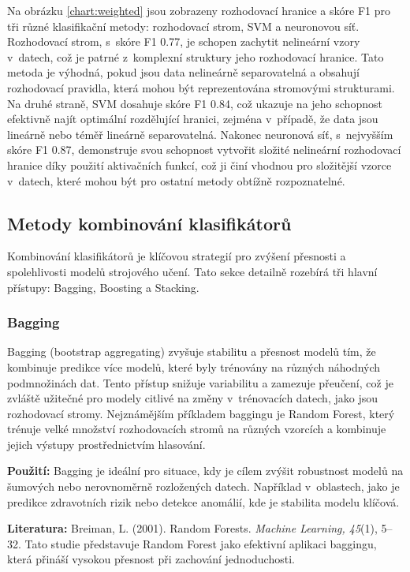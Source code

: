 Na obrázku \ref{chart:weighted} jsou zobrazeny rozhodovací hranice a skóre F1 pro tři různé klasifikační metody: rozhodovací strom, SVM a neuronovou síť. Rozhodovací strom, s~skóre F1 0.77, je schopen zachytit nelineární vzory v~datech, což je patrné z~komplexní struktury jeho rozhodovací hranice. Tato metoda je výhodná, pokud jsou data nelineárně separovatelná a obsahují rozhodovací pravidla, která mohou být reprezentována stromovými strukturami. Na druhé straně, SVM dosahuje skóre F1 0.84, což ukazuje na jeho schopnost efektivně najít optimální rozdělující hranici, zejména v~případě, že data jsou lineárně nebo téměř lineárně separovatelná. Nakonec neuronová síť, s~nejvyšším skóre F1 0.87, demonstruje svou schopnost vytvořit složité nelineární rozhodovací hranice díky použití aktivačních funkcí, což ji činí vhodnou pro složitější vzorce v~datech, které mohou být pro ostatní metody obtížně rozpoznatelné.


\subsection{Metody kombinování klasifikátorů}
Kombinování klasifikátorů je klíčovou strategií pro zvýšení přesnosti a spolehlivosti modelů strojového učení. Tato sekce detailně rozebírá tři hlavní přístupy: Bagging, Boosting a Stacking.

\subsubsection{Bagging}
Bagging (bootstrap aggregating) zvyšuje stabilitu a přesnost modelů tím, že kombinuje predikce více modelů, které byly trénovány na různých náhodných podmnožinách dat. Tento přístup snižuje variabilitu a zamezuje přeučení, což je zvláště užitečné pro modely citlivé na změny v~trénovacích datech, jako jsou rozhodovací stromy. Nejznámějším příkladem baggingu je Random Forest, který trénuje velké množství rozhodovacích stromů na různých vzorcích a kombinuje jejich výstupy prostřednictvím hlasování.

\textbf{Použití:} Bagging je ideální pro situace, kdy je cílem zvýšit robustnost modelů na šumových nebo nerovnoměrně rozložených datech. Například v~oblastech, jako je predikce zdravotních rizik nebo detekce anomálií, kde je stabilita modelu klíčová.

\textbf{Literatura:} Breiman, L. (2001). Random Forests. \textit{Machine Learning, 45}(1), 5–32. \cite{breiman2001random} Tato studie představuje Random Forest jako efektivní aplikaci baggingu, která přináší vysokou přesnost při zachování jednoduchosti.

